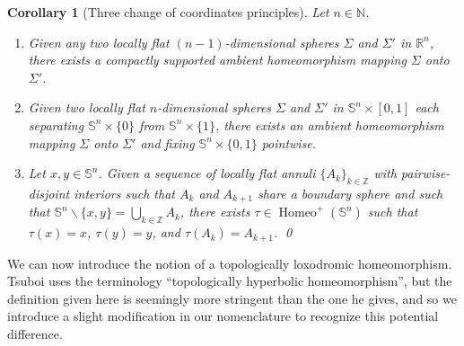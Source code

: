 \documentclass[microtype]{gtpart}
\newcommand{\br}{\mathbb{R}}
\newcommand{\bz}{\mathbb Z}
\newcommand{\bn}{\mathbb N}
\newcommand{\ssm}{\smallsetminus}
\DeclareMathOperator{\Homeo}{Homeo}
\newtheorem{Cor}[Thm]{Corollary}
\theoremstyle{definition}
\numberwithin{equation}{section}
\begin{document}
\begin{Cor}[Three change of coordinates principles]
\label{cor:coordinates}
Let \( n \in \bn \).
\begin{enumerate}[(1)]

\item Given any two locally flat \( (n-1) \)-dimensional spheres \( \Sigma \) and \( \Sigma' \) in \( \br^n \),  there exists a compactly supported ambient homeomorphism mapping \( \Sigma \) onto \( \Sigma' \).

\item Given two locally flat \( n \)-dimensional spheres \( \Sigma \) and \( \Sigma' \) in \( \mathbb S^n \times [0,1] \) each separating \( \mathbb S^n \times \{0\} \) from \( \mathbb S^n \times \{1\} \), there exists an ambient homeomorphism mapping \( \Sigma \) onto \( \Sigma' \) and fixing \( \mathbb S^n \times \{0,1\} \) pointwise. 

\item Let \( x, y \in \mathbb S^n \).
Given a sequence of locally flat annuli \( \{A_k\}_{k\in\bz} \) with pairwise-disjoint interiors  such that \( A_k \) and \( A_{k+1} \) share a boundary sphere and such that \( \mathbb S^n \ssm\{x,y\} = \bigcup_{k\in\bz} A_k \), there exists \( \tau \in \Homeo^+(\mathbb S^n) \) such that \( \tau(x) = x \), \( \tau(y) = y \), and \( \tau(A_k) = A_{k+1} \). \qed
\end{enumerate}
\end{Cor}


We can now introduce the notion of a topologically loxodromic homeomorphism. 
Tsuboi uses the terminology ``topologically hyperbolic homeomorphism'', but the definition given here is seemingly more stringent than the one he gives, and so we introduce a slight modification in our nomenclature to recognize this potential difference. 
\end{document}
